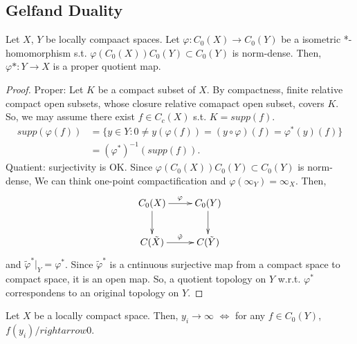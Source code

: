 \subsection{Gelfand Duality}
\begin{proposition}
  Let $X$, $Y$ be locally compaact spaces.
  Let $\varphi : C_0(X) \rightarrow C_0(Y)$ be a isometric *-homomorphism s.t. $\varphi(C_0(X))C_0(Y) \subset C_0(Y)$ is norm-dense.
  Then, $\varphi* : Y \rightarrow X$ is a proper quotient map.
\end{proposition}

\begin{proof}
  Proper: Let $K$ be a compact subset of $X$.
  By compactness, finite relative compact open subsets, whose closure relative comapact open subset, covers $K$.
  So, we may assume there exist $f \in C_c(X)$ s.t. $K = supp(f)$.
  \begin{align*}
    supp(\varphi(f)) &= \{y \in Y : 0 \neq y(\varphi(f)) = (y\circ \varphi)(f) = \varphi^*(y)(f)\}\\
      &= (\varphi^*)^{-1}(supp(f)).
  \end{align*}
  Quatient: surjectivity is OK.
  Since $\varphi(C_0(X))C_0(Y) \subset C_0(Y)$ is norm-dense,
  We can think one-point compactification and $\varphi(\infty_Y) = \infty_X$.
  Then, 
  \[
  \xymatrix{
    C_0(X) \ar[r]^{\varphi} \ar[d] & C_0(Y) \ar[d] \\
    C(\tilde{X}) \ar[r]^{\tilde{\varphi}} & C(\tilde{Y})
  }
  \]
  and $\tilde{\varphi}^*|_Y = \varphi^*$.
  Since $\tilde{\varphi}^*$ is a cntinuous surjective map from a compact space to compact space,
  it is an open map.
  So, a quotient topology on $Y$ w.r.t. $\varphi^*$ correspondens to an original topology on $Y$.  
\end{proof}

\begin{remark}
  Let $X$ be a locally compact space.
  Then, $y_i \rightarrow \infty$ $\Leftrightarrow$ for any $f \in C_0(Y)$, $f(y_i) /rightarrow 0$.
\end{remark}
